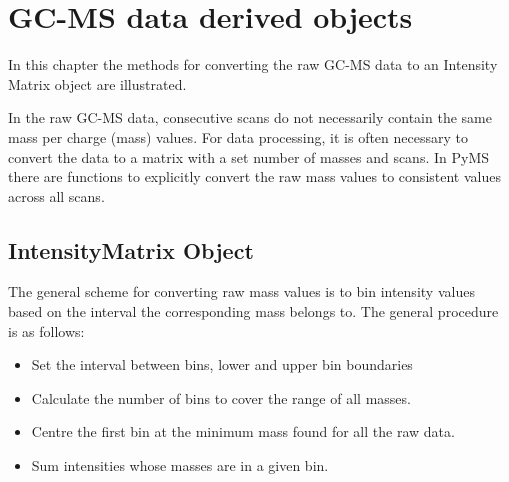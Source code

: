 

\chapter{GC-MS data derived objects}

In this chapter the methods for converting the raw GC-MS data to an
Intensity Matrix object are illustrated.

In the raw GC-MS data, consecutive scans do not necessarily contain the same
mass per charge (mass) values. For data processing, it is often necessary to
convert the data to a matrix with a set number of masses and scans. In PyMS
there are functions to explicitly convert the raw mass values to consistent
values across all scans.

\section{IntensityMatrix Object}

The general scheme for converting raw mass values is to bin intensity values
based on the interval the corresponding mass belongs to. The general procedure
is as follows:
\begin{itemize}
    \item Set the interval between bins, lower and upper bin boundaries
    \item Calculate the number of bins to cover the range of all masses.
    \item Centre the first bin at the minimum mass found for all the raw data.
    \item Sum intensities whose masses are in a given bin.
\end{itemize}

